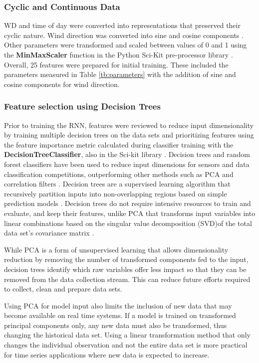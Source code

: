 \subsubsection{Cyclic and Continuous Data}
WD and time of day were converted into representations that preserved their cyclic nature. Wind direction was converted into sine and cosine components \citep{Arhami2013}. Other parameters were transformed and scaled between values of 0 and 1 \citep{Chatterjee2017} using the \textbf{MinMaxScaler} function in the Python Sci-Kit pre-processor library \citep{scikit2011}. Overall, 25 features were prepared for initial training. These included the parameters measured in Table \ref{tb:parameters} with the addition of sine and cosine components for wind direction. 
 
\subsubsection{Feature selection using Decision Trees}
Prior to training the RNN, features were reviewed to reduce input dimensionality by training multiple decision trees  on the data sets and prioritizing features using the feature importance metric calculated during classifier training with the \textbf{DecisionTreeClassifier}, also in the Sci-kit library \citep{scikit2011}. Decision trees and random forest classifiers have been used to reduce input dimensions for sensors \citep{Cho2011} and data classification competitions, outperforming other methods such as PCA and correlation filters \citep{Silipo2014, Al-Alawi2008}. Decision trees are a supervised learning algorithm that recursively partition inputs into non-overlapping regions based on simple prediction models \citep{Singh2013, Loh2011}.  Decision trees do not require intensive resources to train and evaluate, and keep their features, unlike PCA that transforms input variables into linear combinations based on the singular value decomposition (SVD)of the total data set's covariance matrix \citep{Wang2016}. 

While PCA is a form of unsupervised learning that allows dimensionality reduction by removing the number of transformed components fed to the input, decision trees identify which raw variables offer less impact so that they can be removed from the data collection stream. This can reduce future efforts required to collect, clean and prepare data sets. 

Using PCA for model input also limits the inclusion of new data that may become available on real time systems. If a model is trained on transformed principal components only, any new data must also be transformed, thus changing the historical data set. Using a linear transformation method that only changes the individual observation and not the entire data set is more practical for time series applications where new data is expected to increase. 

